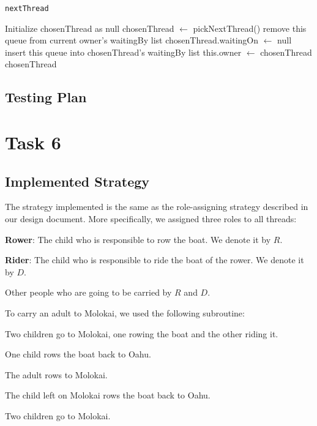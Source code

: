 \documentclass{article}
\begin{document}
\begin{spacing}{1.1}
\begin{algorithm}
  \caption{\texttt{nextThread}}
\begin{algorithmic}[1]
  \STATE Initialize chosenThread as null
  \STATE chosenThread $\leftarrow$ pickNextThread()
    \STATE remove this queue from current owner's waitingBy list
    \STATE chosenThread.waitingOn $\leftarrow$ null
    \STATE insert this queue into chosenThread's waitingBy list
  \ENDIF
  \STATE this.owner $\leftarrow$ chosenThread
\RETURN chosenThread
\end{algorithmic}
\end{algorithm}

\subsection{Testing Plan}

\section{Task 6}

\subsection{Implemented Strategy}
The strategy implemented is the same as the role-assigning strategy described in our design document. More specifically, we assigned three roles to all threads:
\begin{asparaitem}
  \item \textbf{Rower}: The child who is responsible to row the boat. We denote it by $R$.\\
  \item \textbf{Rider}: The child who is responsible to ride the boat of the rower. We denote it by $D$.\\
  \item Other people who are going to be carried by $R$ and $D$.\\
\end{asparaitem}

To carry an adult to Molokai, we used the following subroutine:\\
\begin{asparaitem}
  \item Two children go to Molokai, one rowing the boat and the other riding it.\\
  \item One child rows the boat back to Oahu.\\
  \item The adult rows to Molokai.\\
  \item The child left on Molokai rows the boat back to Oahu.\\
  \item Two children go to Molokai.\\
\end{asparaitem}


\end{spacing}
\end{document}

